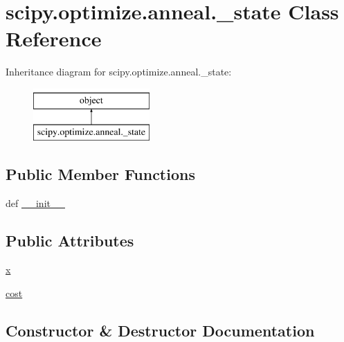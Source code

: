 \hypertarget{classscipy_1_1optimize_1_1anneal_1_1__state}{}\section{scipy.\+optimize.\+anneal.\+\_\+state Class Reference}
\label{classscipy_1_1optimize_1_1anneal_1_1__state}
Inheritance diagram for scipy.\+optimize.\+anneal.\+\_\+state\+:\begin{figure}[H]
\begin{center}
\leavevmode
\includegraphics[height=2.000000cm]{classscipy_1_1optimize_1_1anneal_1_1__state}
\end{center}
\end{figure}
\subsection*{Public Member Functions}
\begin{DoxyCompactItemize}
\item 
def \hyperlink{classscipy_1_1optimize_1_1anneal_1_1__state_a2452bf72cf869a88deb4ebc07a83ad7f}{\+\_\+\+\_\+init\+\_\+\+\_\+}
\end{DoxyCompactItemize}
\subsection*{Public Attributes}
\begin{DoxyCompactItemize}
\item 
\hyperlink{classscipy_1_1optimize_1_1anneal_1_1__state_a066a5aff97f2b794b2e3e13fc59be25e}{x}
\item 
\hyperlink{classscipy_1_1optimize_1_1anneal_1_1__state_a2fea2f83da66445aff48678c091af089}{cost}
\end{DoxyCompactItemize}


\subsection{Constructor \& Destructor Documentation}
\hypertarget{classscipy_1_1optimize_1_1anneal_1_1__state_a2452bf72cf869a88deb4ebc07a83ad7f}{}
